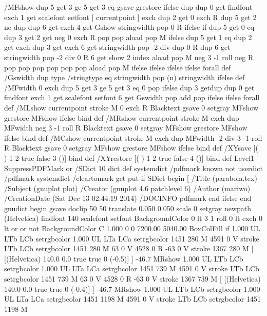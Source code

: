 /MFshow {
   { dup 5 get 3 ge
     { 5 get 3 eq {gsave} {grestore} ifelse }
     {dup dup 0 get findfont exch 1 get scalefont setfont
     [ currentpoint ] exch dup 2 get 0 exch R dup 5 get 2 ne {dup dup 6
     get exch 4 get {Gshow} {stringwidth pop 0 R} ifelse }if dup 5 get 0 eq
     {dup 3 get {2 get neg 0 exch R pop} {pop aload pop M} ifelse} {dup 5
     get 1 eq {dup 2 get exch dup 3 get exch 6 get stringwidth pop -2 div
     dup 0 R} {dup 6 get stringwidth pop -2 div 0 R 6 get
     show 2 index {aload pop M neg 3 -1 roll neg R pop pop} {pop pop pop
     pop aload pop M} ifelse }ifelse }ifelse }
     ifelse }
   forall} def
/Gswidth {dup type /stringtype eq {stringwidth} {pop (n) stringwidth} ifelse} def
/MFwidth {0 exch { dup 5 get 3 ge { 5 get 3 eq { 0 } { pop } ifelse }
 {dup 3 get{dup dup 0 get findfont exch 1 get scalefont setfont
     6 get Gswidth pop add} {pop} ifelse} ifelse} forall} def
/MLshow { currentpoint stroke M
  0 exch R
  Blacktext {gsave 0 setgray MFshow grestore} {MFshow} ifelse } bind def
/MRshow { currentpoint stroke M
  exch dup MFwidth neg 3 -1 roll R
  Blacktext {gsave 0 setgray MFshow grestore} {MFshow} ifelse } bind def
/MCshow { currentpoint stroke M
  exch dup MFwidth -2 div 3 -1 roll R
  Blacktext {gsave 0 setgray MFshow grestore} {MFshow} ifelse } bind def
/XYsave    { [( ) 1 2 true false 3 ()] } bind def
/XYrestore { [( ) 1 2 true false 4 ()] } bind def
Level1 SuppressPDFMark or 
{} {
/SDict 10 dict def
systemdict /pdfmark known not {
  userdict /pdfmark systemdict /cleartomark get put
} if
SDict begin [
  /Title (parabola.tex)
  /Subject (gnuplot plot)
  /Creator (gnuplot 4.6 patchlevel 6)
  /Author (mariwo)
  /CreationDate (Sat Dec 13 02:44:19 2014)
  /DOCINFO pdfmark
end
} ifelse
end
gnudict begin
gsave
doclip
50 50 translate
0.050 0.050 scale
0 setgray
newpath
(Helvetica) findfont 140 scalefont setfont
BackgroundColor 0 lt 3 1 roll 0 lt exch 0 lt or or not {BackgroundColor C 1.000 0 0 7200.00 5040.00 BoxColFill} if
1.000 UL
LTb
LCb setrgbcolor
1.000 UL
LTa
LCa setrgbcolor
1451 280 M
4591 0 V
stroke
LTb
LCb setrgbcolor
1451 280 M
63 0 V
4528 0 R
-63 0 V
stroke
1367 280 M
[ [(Helvetica) 140.0 0.0 true true 0 (-0.5)]
] -46.7 MRshow
1.000 UL
LTb
LCb setrgbcolor
1.000 UL
LTa
LCa setrgbcolor
1451 739 M
4591 0 V
stroke
LTb
LCb setrgbcolor
1451 739 M
63 0 V
4528 0 R
-63 0 V
stroke
1367 739 M
[ [(Helvetica) 140.0 0.0 true true 0 (-0.4)]
] -46.7 MRshow
1.000 UL
LTb
LCb setrgbcolor
1.000 UL
LTa
LCa setrgbcolor
1451 1198 M
4591 0 V
stroke
LTb
LCb setrgbcolor
1451 1198 M
